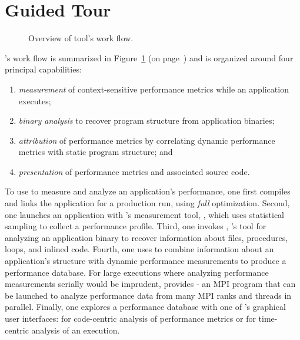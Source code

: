 \documentclass[11pt,letterpaper]{report}
\begin{document}

\section{Guided Tour}
\label{chpt:quickstart:tour}

\begin{figure}[t]
\caption{Overview of \HPCToolkit{} tool's work flow.}
\label{fig:hpctoolkit-overview:b}
\end{figure}

\HPCToolkit{}'s work flow is summarized in Figure~\ref{fig:hpctoolkit-overview:b} (on page~\pageref{fig:hpctoolkit-overview:b}) and is organized around four principal capabilities:
\begin{enumerate}
  \item \emph{measurement} of context-sensitive performance metrics while an application executes;
  \item \emph{binary analysis} to recover program structure from application binaries;
  \item \emph{attribution} of performance metrics by correlating dynamic performance metrics with static program structure; and
  \item \emph{presentation} of performance metrics and associated source code.
\end{enumerate}

To use \HPCToolkit{} to measure and analyze an application's performance, one first compiles and links the application for a production run, using \emph{full} optimization.
Second, one launches an application with \HPCToolkit{}'s measurement tool, \hpcrun{}, which uses statistical sampling to collect a performance profile.
Third, one invokes \hpcstruct{}, \HPCToolkit{}'s tool for analyzing an application binary to recover information about files, procedures, loops, and inlined code.
Fourth, one uses \hpcprof{} to combine information about an application's structure with dynamic performance measurements to produce a performance database.
For large executions where analyzing performance measurements serially would be imprudent, \HPCToolkit{}  provides \hpcprofmpi{} - an MPI program that can be launched to analyze  performance data from many MPI ranks and threads in parallel.
Finally, one explores a performance database with one of \HPCToolkit{}'s graphical user interfaces: \hpcviewer{} for code-centric analysis of performance metrics or  \hpctraceviewer{} for time-centric analysis of an execution.
\end{document}
